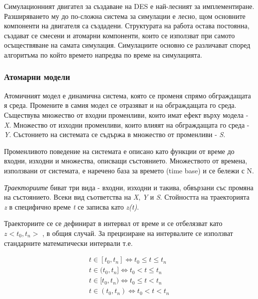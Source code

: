 		Симулационният двигател за създаване на \ac{DES} е най-лесният за имплементиране. Разширяването му
		до по-сложна система за симулации е лесно, щом основните компоненти на двигателя са създадени.
		Структурата на работа остава постоянна, създават се смесени и атомарни компоненти, които се
		използват при самото осъществяване на самата симулация. Симулациите основно се различават според
		алгоритъма по който времето напредва по време на симулацията.
		
		\subsubsection{Атомарни модели}
			
			Атомичният модел е динамична система, която се променя спрямо обграждащата я среда.
			Промените в самия модел се отразяват и на обграждащата го среда. Съществува
			множество от входни променливи, които имат ефект върху модела - \emph{X}. Множество от изходни променливи, 
			които влияят на обграждащата го среда - \emph{Y}. Състонието на системата се съдържа в множество
			от променливи - \emph{S}.
			
			Променливото поведение на системата е описано като функции от време до входни, изходни и множества, описващи
			състоянието. Множеството от времена, използвани от системата, е наречено база за времето (time base) и се бележи с N.
			
			\emph{Траекториите} биват три вида - входни, изходни и такива, обвързани със промяна на състоянието.
			Всеки вид съответства на \emph{X}, \emph{Y} и \emph{S}. Стойността на траекторията \emph{z} в специфично време \emph{t} се записва
			като \emph{z(t)}.
			
			Траекториите се се дефинират в интервал от време и се отбелязват като $z<t_0, t_n>$ , в общия случай. За прецизиране
			на интервалите се използват стандарните математически интервали т.е.
			
			\begin{equation}
			\begin{split}
				t \in [t_0, t_n] \Longleftrightarrow t_0 \le t \le t_n\\
				t \in (t_0, t_n] \Longleftrightarrow t_0 < t \le t_n\\
				t \in [t_0, t_n) \Longleftrightarrow t_0 \le t < t_n\\
				t \in (t_0, t_n) \Longleftrightarrow t_0 < t < t_n
			\end{split}
			\end{equation}
			
